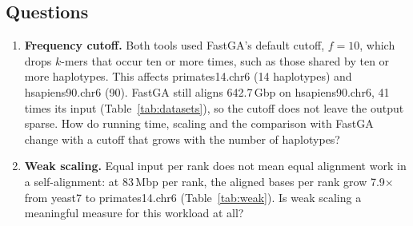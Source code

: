 \subsection{Questions}\label{sec:disc:questions}
\begin{enumerate}
\item \textbf{Frequency cutoff.} Both tools used FastGA's default cutoff,
  $f=10$, which drops $k$-mers that occur ten or more times, such as those
  shared by ten or more haplotypes. This affects primates14.chr6 (14
  haplotypes) and hsapiens90.chr6 (90). FastGA still aligns 642.7\,Gbp on
  hsapiens90.chr6, 41 times its input (Table~\ref{tab:datasets}), so the
  cutoff does not leave the output sparse. How do running time, scaling and
  the comparison with FastGA change with a cutoff that grows with the number
  of haplotypes?
\item \textbf{Weak scaling.} Equal input per rank does not mean equal
  alignment work in a self-alignment: at 83\,Mbp per rank, the aligned bases
  per rank grow 7.9$\times$ from yeast7 to primates14.chr6
  (Table~\ref{tab:weak}). Is weak scaling a meaningful measure for this
  workload at all?
\end{enumerate}
